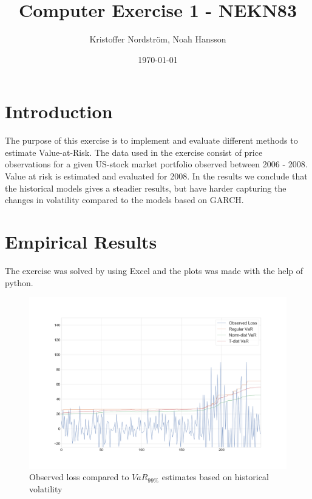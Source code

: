 \documentclass[a4paper]{article}
\title{Computer Exercise 1 - NEKN83}
\author{Kristoffer Nordström, Noah Hansson}
\date{\today}
\begin{document}
\maketitle

\section{Introduction}
The purpose of this exercise is to implement and evaluate different methods to estimate Value-at-Risk. The data used in the exercise consist of price observations for a given US-stock market portfolio observed between 2006 - 2008. Value at risk is estimated and evaluated for 2008. In the results we conclude that the historical models gives a steadier results, but have harder capturing the changes in volatility compared to the models based on GARCH.

\section{Empirical Results}
The exercise was solved by using Excel and the plots was made with the help of python.

\begin{figure}[htbp]
    \includegraphics[width=\textwidth]{VaR1.png}
    \caption{Observed loss compared to $VaR_{99\%}$ estimates based on historical volatility}
    \label{var1}
\end{figure}
\end{document}
